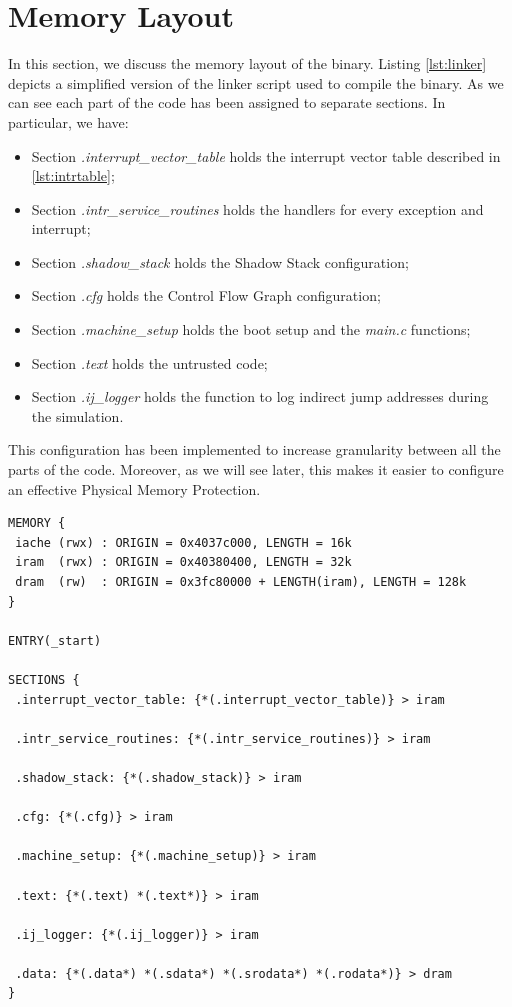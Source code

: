 \section{Memory Layout}
\label{sec:layout}

In this section, we discuss the memory layout of the binary. Listing \ref{lst:linker}
depicts a simplified version of the linker script used to compile the binary. As
we can see each part of the code has been assigned to separate sections. In particular,
we have:
\begin{itemize}
  \item Section \textit{.interrupt\_vector\_table} holds the interrupt vector
    table described in \ref{lst:intrtable};

  \item Section \textit{.intr\_service\_routines} holds the handlers for every
    exception and interrupt;

  \item Section \textit{.shadow\_stack} holds the Shadow Stack configuration;

  \item Section \textit{.cfg} holds the Control Flow Graph configuration;

  \item Section \textit{.machine\_setup} holds the boot setup and the \textit{main.c}
    functions;

  \item Section \textit{.text} holds the untrusted code;

  \item Section \textit{.ij\_logger} holds the function to log indirect jump
    addresses during the simulation.
\end{itemize}

This configuration has been implemented to increase granularity between all the
parts of the code. Moreover, as we will see later, this makes it easier to configure
an effective Physical Memory Protection.

\begin{lstlisting}[style=CStyle, caption= Simplified linker script, label={lst:linker}]
MEMORY {
 iache (rwx) : ORIGIN = 0x4037c000, LENGTH = 16k
 iram  (rwx) : ORIGIN = 0x40380400, LENGTH = 32k
 dram  (rw)  : ORIGIN = 0x3fc80000 + LENGTH(iram), LENGTH = 128k
}

ENTRY(_start)

SECTIONS {
 .interrupt_vector_table: {*(.interrupt_vector_table)} > iram

 .intr_service_routines: {*(.intr_service_routines)} > iram

 .shadow_stack: {*(.shadow_stack)} > iram

 .cfg: {*(.cfg)} > iram

 .machine_setup: {*(.machine_setup)} > iram

 .text: {*(.text) *(.text*)} > iram

 .ij_logger: {*(.ij_logger)} > iram

 .data: {*(.data*) *(.sdata*) *(.srodata*) *(.rodata*)} > dram
}
\end{lstlisting}

